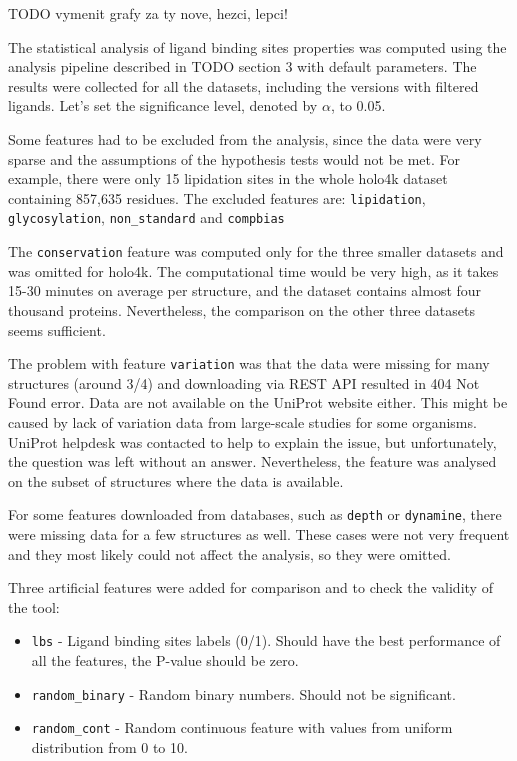 TODO vymenit grafy za ty nove, hezci, lepci!

The statistical analysis of ligand binding sites properties was computed using the analysis pipeline described in TODO section 3 with default parameters. The results were collected for all the datasets, including the versions with filtered ligands. Let's set the significance level, denoted by $\alpha$, to 0.05.

Some features had to be excluded from the analysis, since the data were very sparse and the assumptions of the hypothesis tests would not be met. For example, there were only 15 lipidation sites in the whole holo4k dataset containing  857,635 residues. The excluded features are: \texttt{lipidation}, \texttt{glycosylation}, \texttt{non\_standard} and \texttt{compbias}

The \texttt{conservation} feature was computed only for the three smaller datasets and was omitted for holo4k. The computational time would be very high, as it takes 15-30 minutes on average per structure, and the dataset contains almost four thousand proteins. Nevertheless, the comparison on the other three datasets seems sufficient.

The problem with feature \texttt{variation} was that the data were missing for many structures (around 3/4) and downloading via REST API resulted in 404 Not Found error. Data are not available on the UniProt website either. This might be caused by lack of variation data from large-scale studies for some organisms. UniProt helpdesk was contacted to help to explain the issue, but unfortunately, the question was left without an answer. Nevertheless, the feature was analysed on the subset of structures where the data is available.

For some features downloaded from databases, such as \texttt{depth} or \texttt{dynamine}, there were missing data for a few structures as well. These cases were not very frequent and they most likely could not affect the analysis, so they were omitted.

Three artificial features were added for comparison and to check the validity of the tool:
\begin{itemize}
  \item \texttt{lbs} - Ligand binding sites labels (0/1). Should have the best performance of all the features, the P-value should be zero.
  \item \texttt{random\_binary} - Random binary numbers. Should not be significant.
  \item \texttt{random\_cont} - Random continuous feature with values from uniform distribution from 0 to 10.
\end{itemize}

